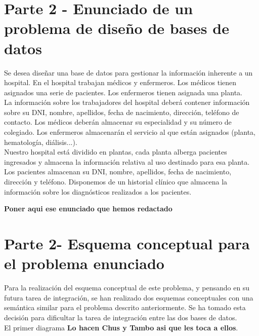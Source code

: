 \documentclass{article}
\begin{document}
\section{Parte 2 - Enunciado de un problema de diseño de bases de datos}

Se desea diseñar una base de datos para gestionar la información inherente a un hospital. En el hospital trabajan médicos y enfermeros. Los médicos tienen asignados una serie de pacientes. Los enfermeros tienen asignada una planta.\\
La información sobre los trabajadores del hospital deberá contener información sobre su DNI, nombre, apellidos, fecha de nacimiento, dirección, teléfono de contacto. Los médicos deberán almacenar su especialidad y su número de colegiado. Los enfermeros almacenarán el servicio al que están asignados (planta, hematología, diálisis...).\\
Nuestro hospital está dividido en plantas, cada planta alberga pacientes ingresados y almacena la información relativa al uso destinado para esa planta.\\
Los pacientes almacenan su DNI, nombre, apellidos, fecha de nacimiento, dirección y teléfono. Disponemos de un historial clínico que almacena la información sobre los diagnósticos realizados a los pacientes.

\textbf{Poner aqui ese enunciado que hemos redactado}

\section{Parte 2- Esquema conceptual para el problema enunciado}

Para la realización del esquema conceptual de este problema, y pensando en su futura tarea de integración, se han realizado dos esquemas conceptuales con una semántica similar para el problema descrito anteriormente. Se ha tomado esta decisión para dificultar la tarea de integración entre las dos bases de datos.\\
El primer diagrama \textbf{{\LARGE Lo hacen Chus y Tambo asi que les toca a ellos}}.\\
\end{document}
